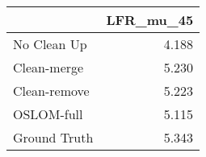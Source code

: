 \begin{tabular}{lr}
\toprule
{} & LFR_mu_45 \\
\midrule
No Clean Up  &     4.188 \\
Clean-merge  &     5.230 \\
Clean-remove &     5.223 \\
OSLOM-full   &     5.115 \\
Ground Truth &     5.343 \\
\bottomrule
\end{tabular}
